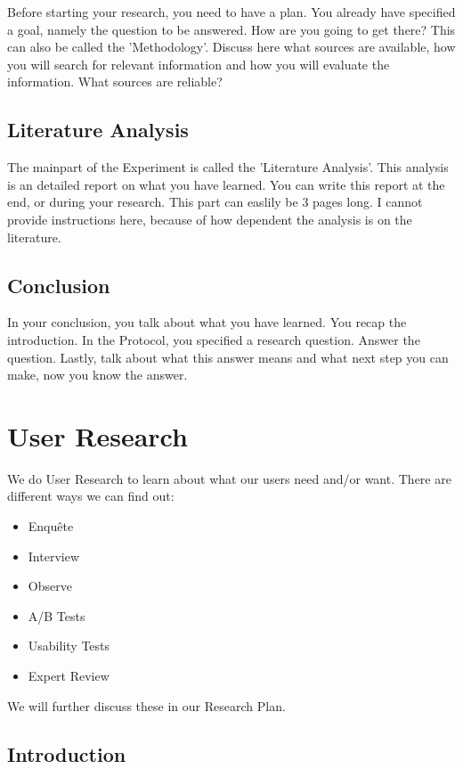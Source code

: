 \documentclass[10pt]{report}
\begin{document}
Before starting your research, you need to have a plan. You already have specified a goal, namely the question to be answered. How are you going to get there? This can also be called the 'Methodology'. Discuss here what sources are available, how you will search for relevant information and how you will evaluate the information. What sources are reliable?

\subsection{Literature Analysis}

The mainpart of the Experiment is called the 'Literature Analysis'. This analysis is an detailed report on what you have learned. You can write this report at the end, or during your research. This part can easlily be 3 pages long. I cannot provide instructions here, because of how dependent the analysis is on the literature.

\subsection{Conclusion}

In your conclusion, you talk about what you have learned. You recap the introduction. In the Protocol, you specified a research question. Answer the question. Lastly, talk about what this answer means and what next step you can make, now you know the answer.

\newpage

\section{User Research}

We do User Research to learn about what our users need and/or want. There are different ways we can find out:

\begin{itemize}
	\item Enquête
	\item Interview
	\item Observe
	\item A/B Tests
	\item Usability Tests
	\item Expert Review
\end{itemize}

\noindent We will further discuss these in our Research Plan.

\subsection{Introduction}
\end{document}
